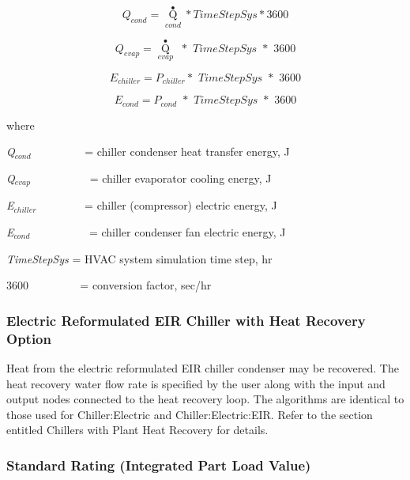\begin{equation}
{Q_{cond}} = {\mathop Q\limits^ \bullet_{cond}}*TimeStepSys*3600
\end{equation}

\begin{equation}
{Q_{evap}} = {\mathop Q\limits^ \bullet_{evap}}\,\,*\,\,TimeStepSys\,\,*\,\,3600
\end{equation}

\begin{equation}
{E_{chiller}} = {P_{chiller}}*\,\,TimeStepSys\,\,*\,\,3600
\end{equation}

\begin{equation}
{E_{cond}} = {P_{cond}}\,\, * \,\,TimeStepSys\,\,*\,\,3600
\end{equation}

where

\emph{Q\(_{cond}\)}~~~~~~~~~ = chiller condenser heat transfer energy, J

\emph{Q\(_{evap}\)}~~~~~~~~~~ = chiller evaporator cooling energy, J

\emph{E\(_{chiller}\)}~~~~~~~~ = chiller (compressor) electric energy, J

\emph{E\(_{cond}\)}~~~~~~~~~~ = chiller condenser fan electric energy, J

\emph{TimeStepSys} = HVAC system simulation time step, hr

\(3600\) ~~~~~~~~ = conversion factor, sec/hr

\subsubsection{Electric Reformulated EIR Chiller with Heat Recovery Option}\label{electric-reformulated-eir-chiller-with-heat-recovery-option}

Heat from the electric reformulated EIR chiller condenser may be recovered. The heat recovery water flow rate is specified by the user along with the input and output nodes connected to the heat recovery loop. The algorithms are identical to those used for Chiller:Electric and Chiller:Electric:EIR. Refer to the section entitled Chillers with Plant Heat Recovery for details.

\subsubsection{Standard Rating (Integrated Part Load Value)}\label{standard-rating-integrated-part-load-value-1}

